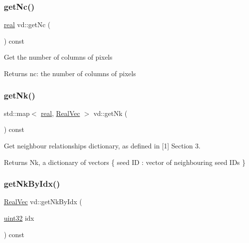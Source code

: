 \subsubsection{\texorpdfstring{get\+Nc()}{getNc()}}
{\footnotesize\ttfamily \mbox{\hyperlink{typedefs_8cpp_a58a0c7cf2501f4492da833421be92547}{real}} vd\+::get\+Nc (\begin{DoxyParamCaption}{ }\end{DoxyParamCaption}) const}

Get the number of columns of pixels \begin{DoxyReturn}{Returns}
nc\+: the number of columns of pixels 
\end{DoxyReturn}
\mbox{\label{classvd_a90613fc46f246a5450e26487caff33f9}} 
\subsubsection{\texorpdfstring{get\+Nk()}{getNk()}}
{\footnotesize\ttfamily std\+::map$<$ \mbox{\hyperlink{typedefs_8cpp_a58a0c7cf2501f4492da833421be92547}{real}}, \mbox{\hyperlink{typedefs_8cpp_a84b6d9a0fbb45e01ad4a3aa5667f2992}{Real\+Vec}} $>$ vd\+::get\+Nk (\begin{DoxyParamCaption}{ }\end{DoxyParamCaption}) const}

Get neighbour relationships dictionary, as defined in \mbox{[}1\mbox{]} Section 3. \begin{DoxyReturn}{Returns}
Nk, a dictionary of vectors \{ seed ID \+: vector of neighbouring seed I\+Ds \} 
\end{DoxyReturn}
\mbox{\label{classvd_a4d058d2d1d675a741a83776c95b2acfb}} 
\subsubsection{\texorpdfstring{get\+Nk\+By\+Idx()}{getNkByIdx()}}
{\footnotesize\ttfamily \mbox{\hyperlink{typedefs_8cpp_a84b6d9a0fbb45e01ad4a3aa5667f2992}{Real\+Vec}} vd\+::get\+Nk\+By\+Idx (\begin{DoxyParamCaption}\item[{\mbox{\hyperlink{typedefs_8cpp_a8ad23e2333787a214e20a58a284a5a60}{uint32}}}]{idx }\end{DoxyParamCaption}) const}

